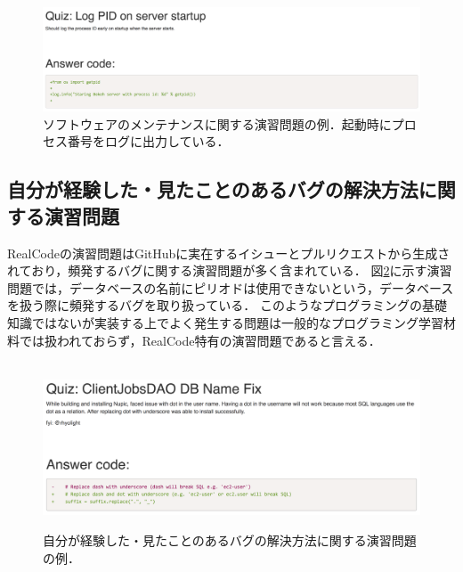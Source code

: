 \begin{figure}[H]
\vspace{-0.05cm}
	\centering
  \includegraphics[width=0.95\columnwidth]{20190107-lab-study-maintenance-exercise.png}
  \vspace{-0.05cm}
  \caption{ソフトウェアのメンテナンスに関する演習問題の例．起動時にプロセス番号をログに出力している．}
  \label{fig:lab-study-eg-maintenance}
  \vspace{-0.35cm}
\end{figure}

\subsection{自分が経験した・見たことのあるバグの解決方法に関する演習問題}

RealCodeの演習問題はGitHubに実在するイシューとプルリクエストから生成されており，頻発するバグに関する演習問題が多く含まれている．
図\ref{fig:lab-study-eg-experience}に示す演習問題では，データベースの名前にピリオドは使用できないという，データベースを扱う際に頻発するバグを取り扱っている．
このようなプログラミングの基礎知識ではないが実装する上でよく発生する問題は一般的なプログラミング学習材料では扱われておらず，RealCode特有の演習問題であると言える．

\begin{figure}[H]
　\centering
　\vspace{-0.3cm}
　\includegraphics[width=0.95\columnwidth]{20190107-lab-study-experience-exercise.png}
  \caption{自分が経験した・見たことのあるバグの解決方法に関する演習問題の例．}
  \label{fig:lab-study-eg-experience}
  \vspace{-0.2cm}
\end{figure}


